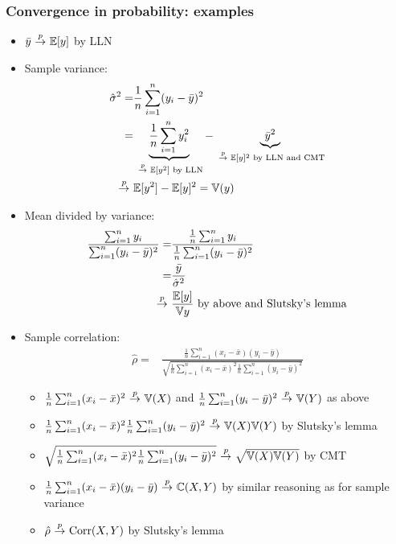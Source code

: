\begin{frame}[allowframebreaks]
  \frametitle{Convergence in probability: examples}
  \begin{itemize}
  \item $\bar{y} \inprob \Er[y]$ by LLN
  \item Sample variance: 
    \begin{align*}
      \hat{\sigma}^2 = & \frac{1}{n} \sum_{i=1}^n (y_i - \bar{y})^2 \\
      = & \underbrace{\frac{1}{n} \sum_{i=1}^n y_i^2}_{\inprob
        \Er[y^2] \text{ by LLN}} -
      \underbrace{\bar{y}^2}_{\inprob  \Er[y]^2 \text{ by LLN and CMT}} \\
      \inprob & \Er[y^2] - \Er[y]^2 = \Var(y)
    \end{align*}
  \item Mean divided by variance:
    \begin{align*}
      \frac{\sum_{i=1}^n y_i}{\sum_{i=1}^n (y_i - \bar{y})^2} = & \frac{\frac{1}{n}
        \sum_{i=1}^n y_i}{\frac{1}{n} \sum_{i=1}^n (y_i - \bar{y})^2}
      \\ 
      = & \frac{\bar{y}}{\hat{\sigma}^2} \\
      \inprob & \frac{\Er[y]}{\Var{y}} \text{ by above and Slutsky's lemma}
    \end{align*}
  \framebreak
  \item Sample correlation:
    \begin{align*}
      \hat{\rho} = & \frac{\frac{1}{n} \sum_{i=1}^n (x_i - \bar{x})(y_i - \bar{y})}
      {\sqrt{\frac{1}{n} \sum_{i=1}^n (x_i - \bar{x})^2 
          \frac{1}{n} \sum_{i=1}^n(y_i - \bar{y})^2}}
    \end{align*}
    \begin{itemize}
    \item 
      $\frac{1}{n} \sum_{i=1}^n (x_i - \bar{x})^2 \inprob \Var(X)$ and 
      $\frac{1}{n} \sum_{i=1}^n(y_i - \bar{y})^2 \inprob \Var(Y)$ as
      above
    \item $\frac{1}{n} \sum_{i=1}^n (x_i - \bar{x})^2 
      \frac{1}{n} \sum_{i=1}^n(y_i - \bar{y})^2 \inprob \Var(X)
      \Var(Y)$ by Slutsky's lemma
    \item $\sqrt{\frac{1}{n} \sum_{i=1}^n (x_i - \bar{x})^2 
        \frac{1}{n} \sum_{i=1}^n(y_i - \bar{y})^2} \inprob
      \sqrt{\Var(X) \Var(Y)}$ by CMT
    \item $\frac{1}{n} \sum_{i=1}^n (x_i - \bar{x})(y_i - \bar{y})
      \inprob \Cov(X,Y)$ by similar reasoning as for sample variance
    \item $\hat{\rho} \inprob \corr(X,Y)$ by Slutsky's lemma
    \end{itemize}
  \end{itemize}
\end{frame}

